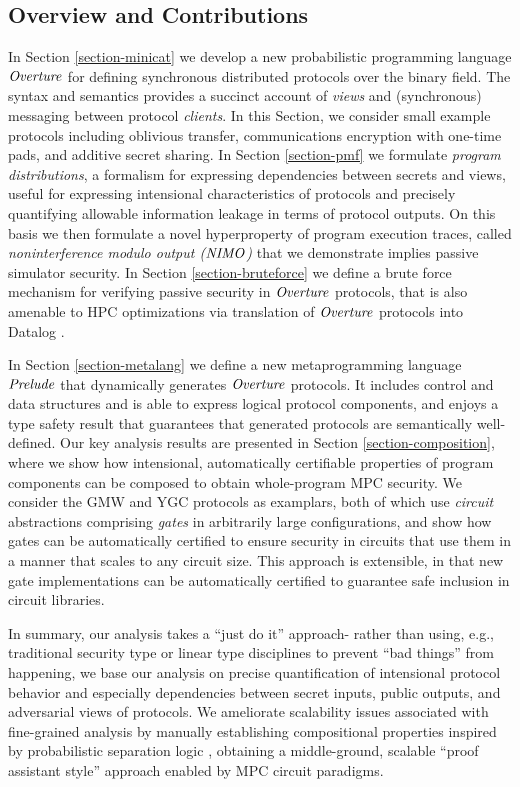 \subsection{Overview and Contributions}

In Section \ref{section-minicat} we develop a new probabilistic programming
language $\mathit{Overture}$ for defining synchronous distributed protocols
over the binary field. The syntax and semantics provides a succinct
account of \emph{views} and (synchronous) messaging between protocol
\emph{clients}. In this Section, we consider small example protocols
including oblivious transfer, communications encryption with one-time
pads, and additive secret sharing. In Section \ref{section-pmf} we
formulate \emph{program distributions}, a formalism for expressing
dependencies between secrets and views, useful for expressing
intensional characteristics of protocols and precisely quantifying
allowable information leakage in terms of protocol outputs. On this
basis we then formulate a novel hyperproperty of program execution
traces, called \emph{noninterference modulo output ($\mathit{NIMO}$)} that we
demonstrate implies passive simulator security. In Section
\ref{section-bruteforce} we define a brute force mechanism for
verifying passive security in $\mathit{Overture}$ protocols, that is also
amenable to HPC optimizations via translation of $\mathit{Overture}$ protocols
into Datalog .

In Section \ref{section-metalang} we define a new metaprogramming
language $\mathit{Prelude}$ that dynamically generates $\mathit{Overture}$
protocols. It includes control and data structures and is able to
express logical protocol components, and enjoys a type safety result
that guarantees that generated protocols are semantically
well-defined. Our key analysis results are presented in Section
\ref{section-composition}, where we show how intensional,
automatically certifiable properties of program components can be
composed to obtain whole-program MPC security. We consider the GMW and
YGC protocols as examplars, both of which use \emph{circuit}
abstractions comprising \emph{gates} in arbitrarily large
configurations, and show how gates can be automatically certified to
ensure security in circuits that use them in a manner that scales to
any circuit size. This approach is extensible, in that new gate
implementations can be automatically certified to guarantee safe
inclusion in circuit libraries.

In summary, our analysis takes a ``just do it'' approach- rather than
using, e.g., traditional security type or linear type disciplines to
prevent ``bad things'' from happening, we base our analysis on precise
quantification of intensional protocol behavior and especially
dependencies between secret inputs, public outputs, and adversarial
views of protocols. We ameliorate scalability issues associated with
fine-grained analysis by manually establishing compositional
properties inspired by probabilistic separation logic
\cite{barthe2019probabilistic}, obtaining a middle-ground, scalable
``proof assistant style'' approach enabled by MPC circuit paradigms.
